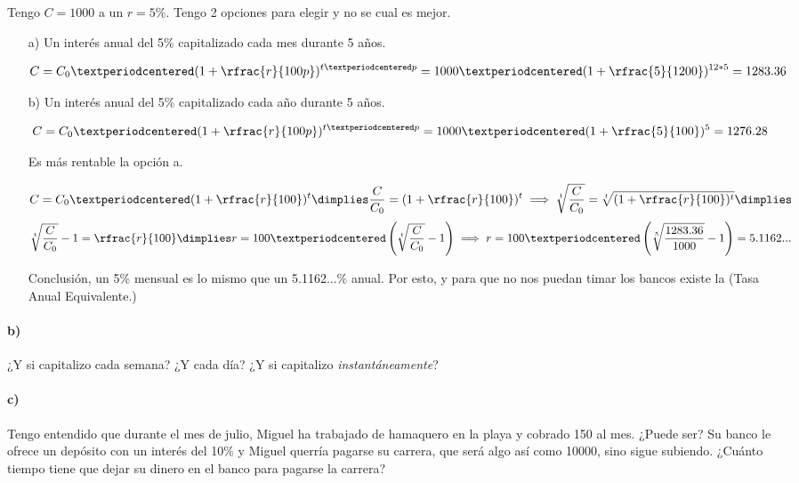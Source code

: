 \begin{example}

Tengo $C= 1000$ a un $r=5\%$. Tengo 2 opciones para elegir y no se cual es mejor. 

\begin{itemize}
	\item[a)] Un interés anual del 5\% capitalizado cada mes durante 5 años.

	\[
		C = C_0·(1+\rfrac{r}{100p})^{t·p} = 1000·(1+\rfrac{5}{1200})^{12*5} = 1283.36
	\]
	\item[b)] Un interés anual del 5\% capitalizado cada año durante 5 años.

	\[
		C = C_0·(1+\rfrac{r}{100p})^{t·p} = 1000·(1+\rfrac{5}{100})^{5} = 1276.28
	\]

	Es más rentable la opción a. 


	\[
		C = C_0·(1+\rfrac{r}{100})^{t} \dimplies \frac{C}{C_0} = (1+\rfrac{r}{100})^t \implies \sqrt[t]{\frac{C}{C_0}} = \sqrt[t]{(1+\rfrac{r}{100})^t} \dimplies
	\]
	\[
 		\sqrt[t]{\frac{C}{C_0}} -1 = \rfrac{r}{100} \dimplies r = 100·\left(\sqrt[t]{\frac{C}{C_0}} -1 \right)\implies r = 100·\left(\sqrt[5]{\frac{1283.36}{1000}} - 1\right) = 5.1162...
	\]

	Conclusión, un 5\% mensual es lo mismo que un 5.1162...\% anual. Por esto, y para que no nos puedan timar los bancos existe la  (Tasa Anual Equivalente.)


\end{itemize}
\end{example}

\paragraph{b)}
¿Y si capitalizo cada semana? ¿Y cada día? ¿Y si capitalizo \textit{instantáneamente}? 

\paragraph{c)}
Tengo entendido que durante el mes de julio, Miguel ha trabajado de hamaquero en la playa y cobrado 150 al mes. ¿Puede ser? Su banco le ofrece un depósito con un interés del 10\% y Miguel querría pagarse su carrera, que será algo así como 10000, sino sigue subiendo.
%
¿Cuánto tiempo tiene que dejar su dinero en el banco para pagarse la carrera?

